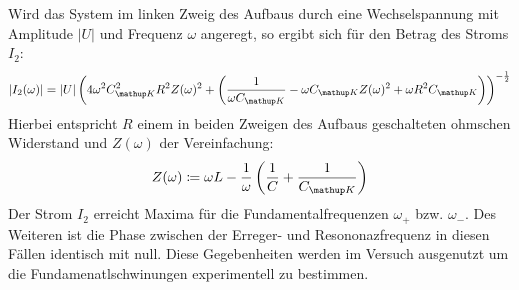 Wird das System im linken Zweig des Aufbaus durch eine Wechselspannung mit Amplitude $\left| U \right|$ und Frequenz $\omega$ angeregt, so ergibt sich für den Betrag des
Stroms $I_2$:
\begin{equation}
|I_2(\omega)| = |U| \left( 4 \omega^2 C\ua{K}^2 R^2 Z(\omega )^2 + \left(\frac{1}{\omega C\ua{K}} - \omega C\ua{K} Z(\omega )^2 + \omega R^2 C\ua{K}\right)\right)^{-\frac{1}{2}}
\label{eq: I_2(omega)}
\end{equation}
Hierbei entspricht $R$ einem in beiden Zweigen des Aufbaus geschalteten ohmschen Widerstand und $Z(\omega)$ der Vereinfachung:
\begin{equation}
  Z(\omega ) \coloneqq \omega L - \frac{1}{\omega } \left(\frac{1}{C} + \frac{1}{C\ua{K}}\right)
\end{equation}
Der Strom $I_2$ erreicht Maxima für die Fundamentalfrequenzen $\omega_+$ bzw. $\omega_-$. Des Weiteren ist die Phase zwischen der Erreger-
und Resononazfrequenz in diesen Fällen identisch mit null. Diese Gegebenheiten werden im Versuch ausgenutzt um
die Fundamenatlschwinungen experimentell zu bestimmen.
